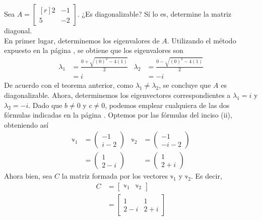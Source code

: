 \begin{example}
    Sea $A = \begin{bmatrix*}[r]
        2 & -1 \\
        5 & -2
    \end{bmatrix*}$. ¿Es diagonalizable? Sí lo es, determine la matriz diagonal. \\
    \solucion En primer lugar, determinemos los eigenvalores de $A$. Utilizando el método expuesto en la página \pageref{metodo_eigen_2x2}, se obtiene que los eigenvalores son
    \begin{align*}
        \lambda_1 & = \frac{0 + \sqrt{(0)^2 - 4(1)}}{2} & \lambda_2 & = \frac{0 - \sqrt{(0)^2 - 4(1)}}{2} \\
        & = i & & = - i
    \end{align*}
    De acuerdo con el teorema anterior, como $\lambda_1 \neq \lambda_2$, se concluye que $A$ es diagonalizable. Ahora, determinemos los eigenvectores correspondientes a $\lambda_1 = i$ y $\lambda_2 = -i$. Dado que $b \neq 0$ y $c \neq 0$, podemos emplear cualquiera de las dos fórmulas indicadas en la página \pageref{metodo_eigen_2x2}. Optemos por las fórmulas del inciso (ii), obteniendo así
    \begin{align*}
        \mathbb{v}_1 & = \begin{pmatrix} -1 \\ i - 2 \end{pmatrix} & \mathbb{v}_2 & = \begin{pmatrix} -1 \\ - i -2 \end{pmatrix} \\
        & = \begin{pmatrix} 1 \\ 2 - i \end{pmatrix} & & = \begin{pmatrix} 1 \\ 2 + i \end{pmatrix}
    \end{align*}
    Ahora bien, sea $C$ la matriz formada por los vectores $\mathbb{v}_1$ y $\mathbb{v}_2$. Es decir,
    \begin{align*}
        C & = \begin{bmatrix} \mathbb{v}_1 & \mathbb{v}_2 \end{bmatrix} \\
        & = \begin{bmatrix} 1 & 1 \\ 2 - i & 2 + i \end{bmatrix}

\end{align*}
\end{example}
